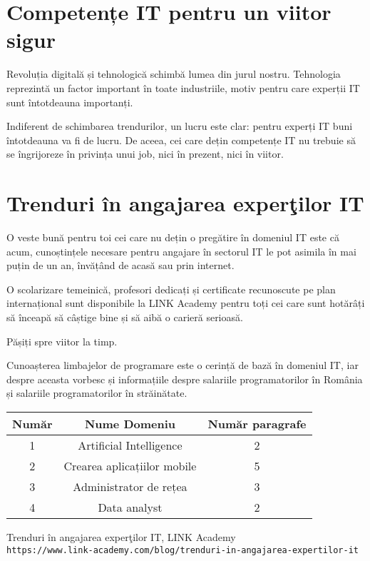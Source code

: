 \documentclass{article}
\begin{document}
\section{Competențe IT pentru un viitor sigur}
\hspace{0.5 cm}Revoluția digitală și tehnologică schimbă lumea din jurul nostru. Tehnologia reprezintă un factor important în toate industriile, motiv pentru care experții IT sunt întotdeauna importanți.\par
Indiferent de schimbarea trendurilor, un lucru este clar: pentru experți IT buni întotdeauna va fi de lucru. De aceea, cei care dețin competențe IT nu trebuie să se îngrijoreze în privința unui job, nici în prezent, nici în viitor.
\section{Trenduri în angajarea experţilor IT}
\hspace{0.5 cm}O veste bună pentru toi cei care nu dețin o pregătire în domeniul IT este că acum, cunoștințele necesare pentru angajare în sectorul IT le pot asimila în mai puțin de un an, învățând de acasă sau prin internet.\par
O scolarizare temeinică, profesori dedicați și certificate recunoscute pe plan internațional sunt disponibile la LINK Academy pentru toți cei care sunt hotărâți să înceapă să câștige bine și să aibă o carieră serioasă.\par
Pășiți  spre viitor la timp.\par
Cunoașterea limbajelor de programare este o cerință de bază în domeniul IT, iar despre aceasta vorbesc și informațiile despre salariile programatorilor în România și salariile programatorilor în străinătate.

\begin{center}
 \begin{tabular}{||c c c||} 
 \hline
 Număr & Nume Domeniu & Număr paragrafe \\ [0.5ex] 
 \hline\hline
 1 & Artificial Intelligence & 2 \\ 
 \hline
 2 &  Crearea aplicațiilor mobile & 5 \\
 \hline
 3 & Administrator de rețea  & 3 \\
 \hline
 4 & Data analyst  & 2 \\ [1ex]
 \hline
\end{tabular}
\end{center}
\begin{thebibliography}{9}
Trenduri în angajarea experţilor IT, LINK Academy
\\\texttt{https://www.link-academy.com/blog/trenduri-in-angajarea-expertilor-it}
\end{thebibliography}
\end{document}
